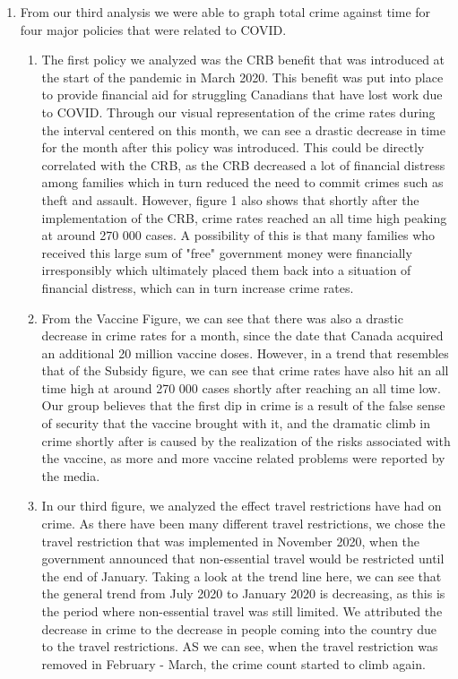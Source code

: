 \documentclass[fontsize=11pt]{article}
\begin{document}
\begin{enumerate}
\item From our third analysis we were able to graph total crime against time for four major policies that were related to COVID. 
\begin{enumerate}
    \item The first policy we analyzed was the CRB benefit that was introduced at the start of the pandemic in March 2020. This benefit was put into place to provide financial aid for struggling Canadians that have lost work due to COVID. Through our visual representation of the crime rates during the interval centered on this month, we can see a drastic decrease in time for the month after this policy was introduced. This could be directly correlated with the CRB, as the CRB decreased a lot of financial distress among families which in turn reduced the need to commit crimes such as theft and assault. However, figure 1 also shows that shortly after the implementation of the CRB, crime rates reached an all time high peaking at around 270 000 cases. A possibility of this is that many families who received this large sum of "free" government money were financially irresponsibly which ultimately placed them back into a situation of financial distress, which can in turn increase crime rates.

\item From the Vaccine Figure, we can see that there was also a drastic decrease in crime rates for a month, since the date that Canada acquired an additional 20 million vaccine doses. However, in a trend that resembles that of the Subsidy figure, we can see that crime rates have also hit an all time high at around 270 000 cases shortly after reaching an all time low. Our group believes that the first dip in crime is a result of the false sense of security that the vaccine brought with it, and the dramatic climb in crime shortly after is caused by the realization of the risks associated with the vaccine, as more and more vaccine related problems were reported by the media. 
\item In our third figure, we analyzed the effect travel restrictions have had on crime. As there have been many different travel restrictions, we chose the travel restriction that was implemented in November 2020, when the government announced that non-essential travel would be restricted until the end of January. Taking a look at the trend line here, we can see that the general trend from July 2020 to January 2020 is decreasing, as this is the period where non-essential travel was still limited. We attributed the decrease in crime to the decrease in people coming into the country due to the travel restrictions. AS we can see, when the travel restriction was removed in February - March, the crime count started to climb again. 


\end{enumerate}
\end{enumerate}
\end{document}
